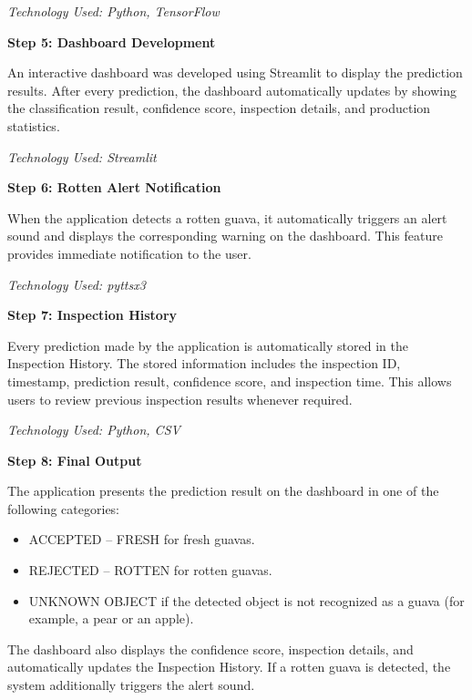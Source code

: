 \textit{Technology Used: Python, TensorFlow}

\vspace{0.3cm}
\newpage

\textbf{Step 5: Dashboard Development}

An interactive dashboard was developed using Streamlit to display the prediction results. After every prediction, the dashboard automatically updates by showing the classification result, confidence score, inspection details, and production statistics.

\textit{Technology Used: Streamlit}

\vspace{0.3cm}

\textbf{Step 6: Rotten Alert Notification}

When the application detects a rotten guava, it automatically triggers an alert sound and displays the corresponding warning on the dashboard. This feature provides immediate notification to the user.

\textit{Technology Used: pyttsx3}

\vspace{0.3cm}

\textbf{Step 7: Inspection History}

Every prediction made by the application is automatically stored in the Inspection History. The stored information includes the inspection ID, timestamp, prediction result, confidence score, and inspection time. This allows users to review previous inspection results whenever required.

\textit{Technology Used: Python, CSV}

\vspace{0.3cm}

\textbf{Step 8: Final Output}

The application presents the prediction result on the dashboard in one of the following categories:
\begin{itemize}[leftmargin=1.5cm]
    \item ACCEPTED -- FRESH for fresh guavas.
    \item REJECTED -- ROTTEN for rotten guavas.
    \item UNKNOWN OBJECT if the detected object is not recognized as a guava (for example, a pear or an apple).
\end{itemize}

The dashboard also displays the confidence score, inspection details, and automatically updates the Inspection History. If a rotten guava is detected, the system additionally triggers the alert sound.

